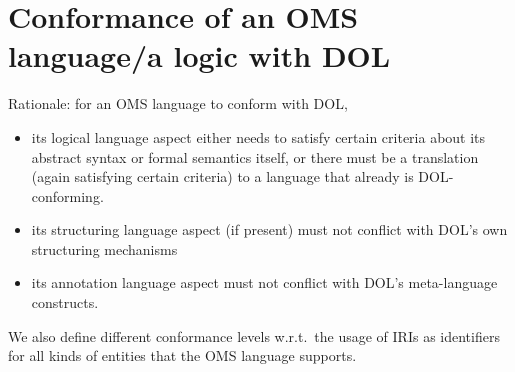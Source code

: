 \documentclass[10pt,%
\ifpretendfinal
final%
\else
draft%
\fi,
]{scrreprt}
\makeatletter
\newcommand*\CommentAuthor{}
\renewcommand*\CommentAuthor{#1}}
\newcommand*\CommentDate{}
\renewcommand*\CommentDate{#1}}
\newcommand*\CommentId{}
\renewcommand*\CommentId{#1}}
\newcommand*\CommentType{}
\renewcommand*\CommentType{#1}}
\newcommand*{\SetCommentColorByType}[1]{%
\edef\localType{{#1}}%
\expandafter\ifstrequal\localType{q-aut}{\colorlet{CommentColor}{red}}{%
\expandafter\ifstrequal\localType{q-all}{\colorlet{CommentColor}{orange}}{%
\expandafter\ifstrequal\localType{todo}{\colorlet{CommentColor}{orange}}{%
\expandafter\ifstrequal\localType{fyi}{\colorlet{CommentColor}{lightgray}}{%
\colorlet{CommentColor}{yellow}}}}}}
\newcommand*{\SetCommentPrefixByType}[1]{%
\edef\localType{{#1}}%
\expandafter\@ifmtarg\localType{%
\edef\CommentPrefix{}%
}{%
\caseupper[q]{#1}%
\edef\CommentPrefix{\thestring: }%
}}
\newcommand*{\initComment}[1]{%
\setkeys{Comment}{#1}%
\SetCommentColorByType{\CommentType}%
\relax%
\SetCommentPrefixByType{\CommentType}%
\relax%
}
\newcommand*{\todonote}[2][]{%
\initComment{#1}%
\pdfcomment[author=\CommentAuthor,color=CommentColor,date=\CommentDate,id=\CommentId]{%
\CommentPrefix
#2}}
\renewcommand*{\todonote}[2][]{%
\initComment{#1}%
\ednote{\CommentPrefix #2}}
\newcommand{\sclause}[1]{\section{#1}}
\makeatother
\begin{document}
\sclause{Conformance of an OMS language/a logic with DOL}\label{c:conform:logic}

Rationale: for an OMS language to conform with DOL,
\begin{itemize}
\item its logical language aspect either needs to satisfy certain criteria about its abstract syntax or formal semantics itself, or there must be a translation (again satisfying certain criteria) to a language that already is DOL-conforming.
\item its structuring language aspect (if present) must not conflict with DOL's own structuring mechanisms
\item its annotation language aspect must not conflict with DOL's meta-language constructs.
\end{itemize}
We also define different conformance levels w.r.t.\ the usage of IRIs as identifiers for all kinds of entities that the OMS language supports.

%
%
\end{document}
